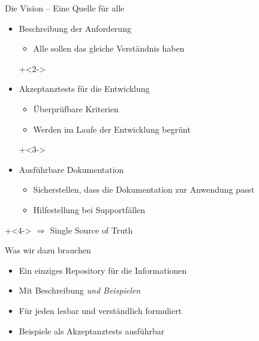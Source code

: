 \begin{frame}{Die Vision -- Eine Quelle für alle}

\begin{itemize}
	\item Beschreibung der Anforderung
	\begin{itemize}
		\item Alle sollen das gleiche Verständnis haben
	\end{itemize}

\onslide+<2->
	
	\item Akzeptanztests für die Entwicklung
	\begin{itemize}
		\item Überprüfbare Kriterien
		\item Werden im Laufe der Entwicklung \glqq begrünt\grqq
	\end{itemize}

\onslide+<3->
	
	\item Ausführbare Dokumentation
	\begin{itemize}
		\item Sicherstellen, dass die Dokumentation zur Anwendung passt
		\item Hilfestellung bei Supportfällen
	\end{itemize}
\end{itemize}

\vspace{1em}

\onslide+<4->
$\Rightarrow$ Single Source of Truth

\end{frame}


\begin{frame}{Was wir dazu brauchen}

\begin{itemize}
	\item Ein einziges Repository für die Informationen
	\item Mit Beschreibung \em und \em Beispielen
	\item Für jeden lesbar und verständlich formuliert
        \item Beispiele als Akzeptanztests ausführbar

\end{itemize}

\end{frame}




